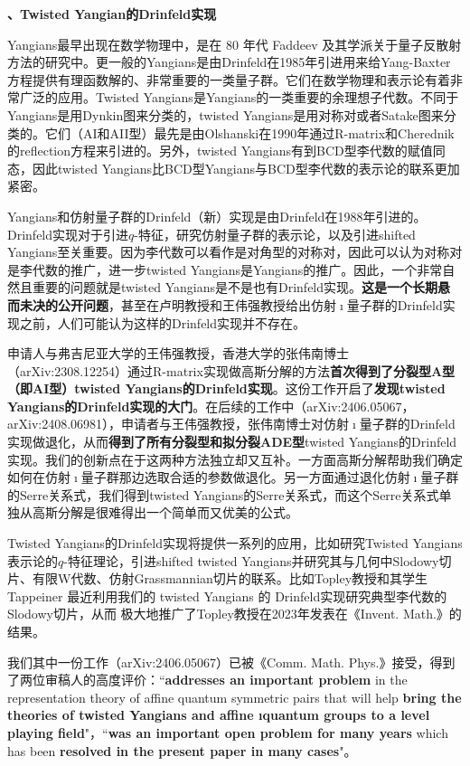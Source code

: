 \documentclass[12pt,UTF8,AutoFakeBold=4,a4paper]{ctexart}
\begin{document}
\medskip

\textbf{、Twisted Yangian的Drinfeld实现}

Yangians最早出现在数学物理中，是在 80 年代 Faddeev 及其学派关于量子反散射方法的研究中。更一般的Yangians是由Drinfeld在1985年引进用来给Yang-Baxter方程提供有理函数解的、非常重要的一类量子群。它们在数学物理和表示论有着非常广泛的应用。Twisted Yangians是Yangians的一类重要的余理想子代数。不同于Yangians是用Dynkin图来分类的，twisted Yangians是用对称对或者Satake图来分类的。它们（AI和AII型）最先是由Olshanski在1990年通过R-matrix和Cherednik的reflection方程来引进的。另外，twisted Yangians有到BCD型李代数的赋值同态，因此twisted Yangians比BCD型Yangians与BCD型李代数的表示论的联系更加紧密。

Yangians和仿射量子群的Drinfeld（新）实现是由Drinfeld在1988年引进的。Drinfeld实现对于引进$q$-特征，研究仿射量子群的表示论，以及引进shifted Yangians至关重要。因为李代数可以看作是对角型的对称对，因此可以认为对称对是李代数的推广，进一步twisted Yangians是Yangians的推广。因此，一个非常自然且重要的问题就是twisted Yangians是不是也有Drinfeld实现。\textbf{这是一个长期悬而未决的公开问题}，甚至在卢明教授和王伟强教授给出仿射$\imath$量子群的Drinfeld实现之前，人们可能认为这样的Drinfeld实现并不存在。

申请人与弗吉尼亚大学的王伟强教授，香港大学的张伟南博士（arXiv:2308.12254）通过R-matrix实现做高斯分解的方法\textbf{首次得到了分裂型A型（即AI型）twisted Yangians的Drinfeld实现}。这份工作开启了\textbf{发现twisted Yangians的Drinfeld实现的大门}。在后续的工作中（arXiv:2406.05067，arXiv:2408.06981），申请者与王伟强教授，张伟南博士对仿射$\imath$量子群的Drinfeld实现做退化，从而\textbf{得到了所有分裂型和拟分裂ADE型}twisted Yangians的Drinfeld实现。我们的创新点在于这两种方法独立却又互补。一方面高斯分解帮助我们确定如何在仿射$\imath$量子群那边选取合适的参数做退化。另一方面通过退化仿射$\imath$量子群的Serre关系式，我们得到twisted Yangians的Serre关系式，而这个Serre关系式单独从高斯分解是很难得出一个简单而又优美的公式。

Twisted Yangians的Drinfeld实现将提供一系列的应用，比如研究Twisted Yangians表示论的$q$-特征理论，引进shifted twisted Yangians并研究其与几何中Slodowy切片、有限W代数、仿射Grassmannian切片的联系。比如Topley教授和其学生Tappeiner 最近利用我们的 twisted Yangians 的 Drinfeld实现研究典型李代数的Slodowy切片，从而 极大地推广了Topley教授在2023年发表在《Invent. Math.》的结果。

我们其中一份工作（arXiv:2406.05067）已被《Comm. Math. Phys.》接受，得到了两位审稿人的高度评价：``\textbf{addresses an important problem} in the representation theory of affine
quantum symmetric pairs that will help \textbf{bring the theories of twisted Yangians and affine ıquantum groups to a level playing field}"，``\textbf{was an important open problem for many years} which has been \textbf{resolved in the present paper in many cases}"。
\end{document}
